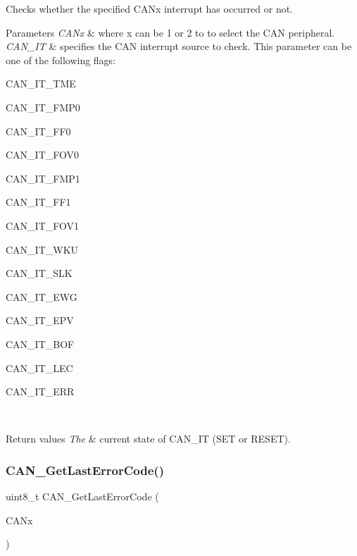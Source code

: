 Checks whether the specified C\+A\+Nx interrupt has occurred or not. 


\begin{DoxyParams}{Parameters}
{\em C\+A\+Nx} & where x can be 1 or 2 to to select the C\+AN peripheral. \\
\hline
{\em C\+A\+N\+\_\+\+IT} & specifies the C\+AN interrupt source to check. This parameter can be one of the following flags\+:
\begin{DoxyItemize}
\item C\+A\+N\+\_\+\+I\+T\+\_\+\+T\+ME
\item C\+A\+N\+\_\+\+I\+T\+\_\+\+F\+M\+P0
\item C\+A\+N\+\_\+\+I\+T\+\_\+\+F\+F0
\item C\+A\+N\+\_\+\+I\+T\+\_\+\+F\+O\+V0
\item C\+A\+N\+\_\+\+I\+T\+\_\+\+F\+M\+P1
\item C\+A\+N\+\_\+\+I\+T\+\_\+\+F\+F1
\item C\+A\+N\+\_\+\+I\+T\+\_\+\+F\+O\+V1
\item C\+A\+N\+\_\+\+I\+T\+\_\+\+W\+KU
\item C\+A\+N\+\_\+\+I\+T\+\_\+\+S\+LK
\item C\+A\+N\+\_\+\+I\+T\+\_\+\+E\+WG
\item C\+A\+N\+\_\+\+I\+T\+\_\+\+E\+PV
\item C\+A\+N\+\_\+\+I\+T\+\_\+\+B\+OF
\item C\+A\+N\+\_\+\+I\+T\+\_\+\+L\+EC
\item C\+A\+N\+\_\+\+I\+T\+\_\+\+E\+RR 
\end{DoxyItemize}\\
\hline
\end{DoxyParams}

\begin{DoxyRetVals}{Return values}
{\em The} & current state of C\+A\+N\+\_\+\+IT (S\+ET or R\+E\+S\+ET). \\
\hline
\end{DoxyRetVals}
\mbox{\label{group___c_a_n___exported___functions_gaaee721a392b6b21bfd15dc160aeb6924}} 
\subsubsection{\texorpdfstring{CAN\_GetLastErrorCode()}{CAN\_GetLastErrorCode()}}
{\footnotesize\ttfamily uint8\+\_\+t C\+A\+N\+\_\+\+Get\+Last\+Error\+Code (\begin{DoxyParamCaption}\item[{\mbox{\hyperlink{struct_c_a_n___type_def}{C\+A\+N\+\_\+\+Type\+Def}} $\ast$}]{C\+A\+Nx }\end{DoxyParamCaption})}



